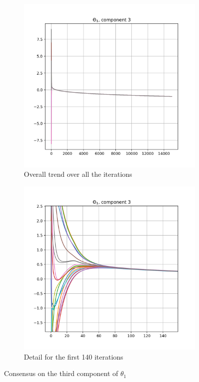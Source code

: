 \documentclass[a4paper,11pt,oneside]{book}
\begin{document}
\begin{figure}[ht]
	\centering
	\begin{subfigure}{.5\textwidth}
		\centering
		\includegraphics[scale=.4]{figs/theta_1_3_overall}
		\caption{Overall trend over all the iterations}
		\label{avg_consensus:overall}
	\end{subfigure}%
	\begin{subfigure}{.5\textwidth}
		\centering
		\includegraphics[scale=.4]{figs/theta_1_3_detail}
		\caption{Detail for the first 140 iterations}
		\label{avg_consensus:detail}
	\end{subfigure}
	\caption{Consensus on the third component of $\theta_1$}
	\label{avg_consensus}
\end{figure}
\end{document}
